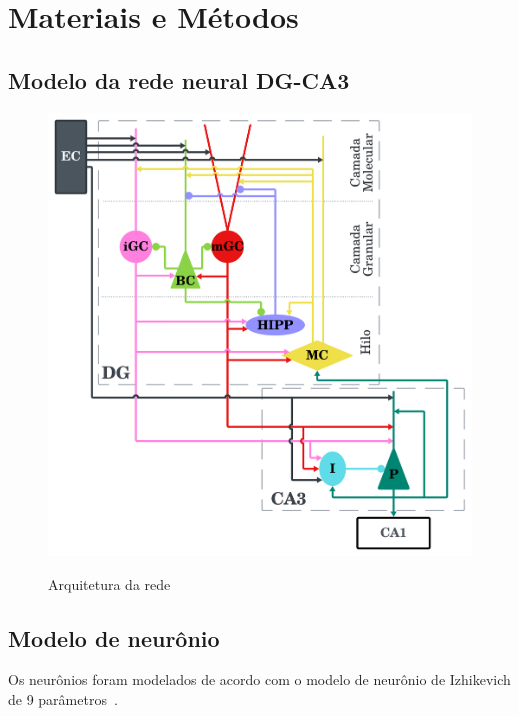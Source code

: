 \chapter{Materiais e Métodos}

\section{Modelo da rede neural DG-CA3}




\begin{figure}
    \centering
    \caption{Arquitetura da rede}
    \includegraphics[scale=0.7]{figuras/arquitetura-rede.png}
    \label{fig:arquitetura-rede}
\end{figure}


\section{Modelo de neurônio}

Os neurônios foram modelados de acordo com o modelo de neurônio de Izhikevich de 9 parâmetros~\cite[cap.~8]{izhikevichDynamical2006}.






